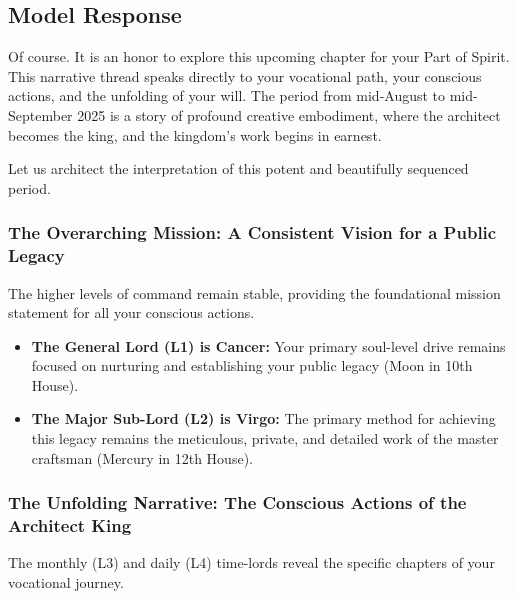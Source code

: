 \documentclass{article}
\begin{document}
\subsection*{Model Response}\label{model-response}

Of course. It is an honor to explore this upcoming chapter for your Part of Spirit. This narrative thread speaks directly to your vocational path, your conscious actions, and the unfolding of your will. The period from mid-August to mid-September 2025 is a story of profound creative embodiment, where the architect becomes the king, and the kingdom's work begins in earnest.

Let us architect the interpretation of this potent and beautifully sequenced period.

\subsubsection*{The Overarching Mission: A Consistent Vision for a Public Legacy}\label{the-overarching-mission-a-consistent-vision-for-a-public-legacy}

The higher levels of command remain stable, providing the foundational mission statement for all your conscious actions.

\begin{itemize}
\item
  \textbf{The General Lord (L1) is Cancer:} Your primary soul-level drive remains focused on nurturing and establishing your public legacy (Moon in 10th House).
\item
  \textbf{The Major Sub-Lord (L2) is Virgo:} The primary method for achieving this legacy remains the meticulous, private, and detailed work of the master craftsman (Mercury in 12th House).
\end{itemize}

\subsubsection*{The Unfolding Narrative: The Conscious Actions of the Architect King}\label{the-unfolding-narrative-the-conscious-actions-of-the-architect-king}

The monthly (L3) and daily (L4) time-lords reveal the specific chapters of your vocational journey.
\end{document}
